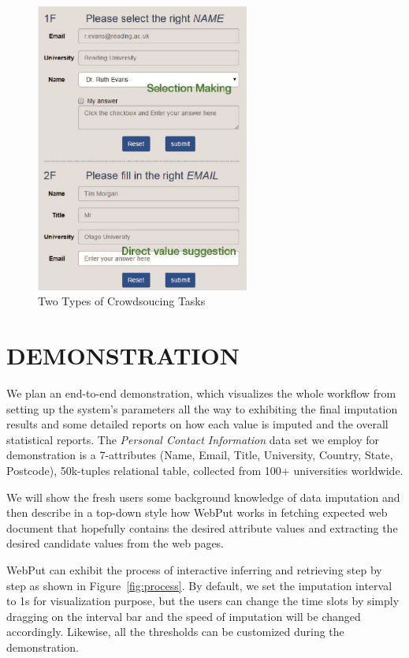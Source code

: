 \documentclass[sigconf]{acmart}
\begin{document}
\begin{figure}[!htb]
  \centerline{\includegraphics[width=7cm]{images/crowd.eps}}
  \caption{Two Types of Crowdsoucing Tasks}
  \label{fig:crowdsource}
\end{figure}

\section{DEMONSTRATION}
We plan an end-to-end demonstration, which visualizes the whole workflow from setting up the system's parameters all the way to exhibiting the final imputation results and some detailed reports on how each value is imputed and the overall statistical reports.
%
The {\em Personal Contact Information} data set we employ for demonstration is a 7-attributes (Name, Email, Title, University, Country, State, Postcode), 50k-tuples relational table, collected from 100+ universities worldwide.

We will show the fresh users some background knowledge of data imputation and then describe in a top-down style how WebPut works in fetching expected web document that hopefully contains the desired attribute values and extracting the desired candidate values from the web pages.

WebPut can exhibit the process of interactive inferring and retrieving step by step as shown in Figure~\ref{fig:process}. By default, we set the imputation interval to 1s for visualization purpose, but the users can change the time slots by simply dragging on the interval bar and the speed of imputation will be changed accordingly. Likewise, all the thresholds can be customized during the demonstration.
\end{document}
